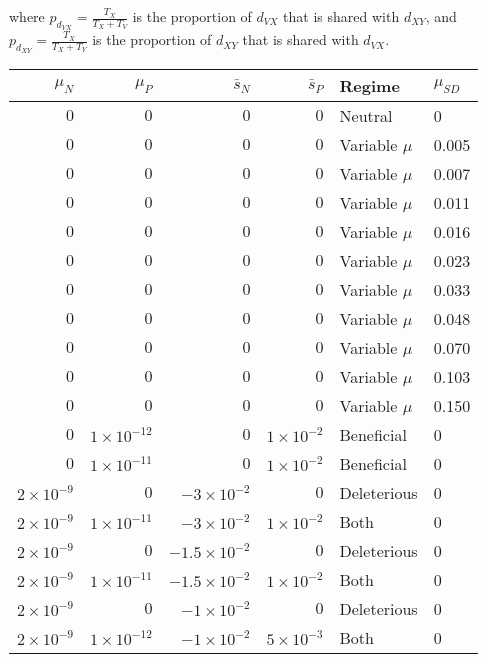 where $p_{d_{VX}} = \frac{T_X}{T_X+T_V}$ is the proportion of $d_{VX}$ that is shared with $d_{XY}$, and $p_{d_{XY}} = \frac{T_X}{T_X+T_Y}$ is the proportion of $d_{XY}$ that is shared with $d_{VX}$.


\begin{table}
\tiny
\centering
\begin{tabular}{rrrrll}
  \hline
$\mu_N$ & $\mu_P$ & $\bar{s}_N$ & $\bar{s}_P$ & Regime & $\mu_{SD}$ \\ 
  \hline
$0$ & $0$ & $0$ & $0$ & Neutral & 0 \\ 
  $0$ & $0$ & $0$ & $0$ & Variable $\mu$ & 0.005 \\ 
  $0$ & $0$ & $0$ & $0$ & Variable $\mu$ & 0.007 \\ 
  $0$ & $0$ & $0$ & $0$ & Variable $\mu$ & 0.011 \\ 
  $0$ & $0$ & $0$ & $0$ & Variable $\mu$ & 0.016 \\ 
  $0$ & $0$ & $0$ & $0$ & Variable $\mu$ & 0.023 \\ 
  $0$ & $0$ & $0$ & $0$ & Variable $\mu$ & 0.033 \\ 
  $0$ & $0$ & $0$ & $0$ & Variable $\mu$ & 0.048 \\ 
  $0$ & $0$ & $0$ & $0$ & Variable $\mu$ & 0.070 \\ 
  $0$ & $0$ & $0$ & $0$ & Variable $\mu$ & 0.103 \\ 
  $0$ & $0$ & $0$ & $0$ & Variable $\mu$ & 0.150 \\ 
  $0$ & $1 \times 10^{-12}$ & $0$ & $1 \times 10^{-2}$ & Beneficial & 0 \\ 
  $0$ & $1 \times 10^{-11}$ & $0$ & $1 \times 10^{-2}$ & Beneficial & 0 \\ 
  $2 \times 10^{-9}$ & $0$ & $-3 \times 10^{-2}$ & $0$ & Deleterious & 0 \\ 
  $2 \times 10^{-9}$ & $1 \times 10^{-11}$ & $-3 \times 10^{-2}$ & $1 \times 10^{-2}$ & Both & 0 \\ 
  $2 \times 10^{-9}$ & $0$ & $-1.5 \times 10^{-2}$ & $0$ & Deleterious & 0 \\ 
  $2 \times 10^{-9}$ & $1 \times 10^{-11}$ & $-1.5 \times 10^{-2}$ & $1 \times 10^{-2}$ & Both & 0 \\ 
  $2 \times 10^{-9}$ & $0$ & $-1 \times 10^{-2}$ & $0$ & Deleterious & 0 \\ 
  $2 \times 10^{-9}$ & $1 \times 10^{-12}$ & $-1 \times 10^{-2}$ & $5 \times 10^{-3}$ & Both & 0 \\ 

\end{tabular}
\end{table}
